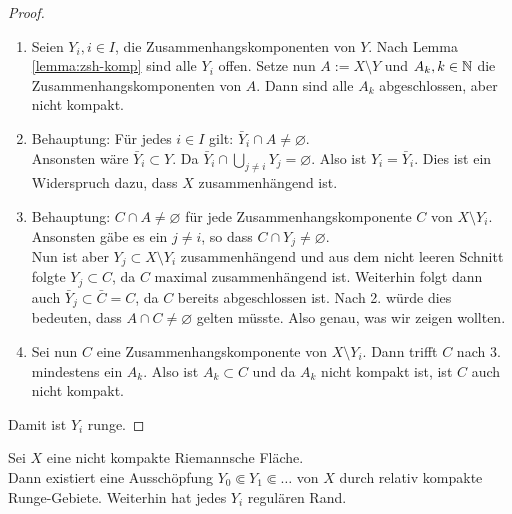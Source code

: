 \begin{proof}
  \begin{enumerate}
  \item Seien $Y_i, i \in I$, die Zusammenhangskomponenten von
    $Y$. Nach Lemma \ref{lemma:zsh-komp} sind alle $Y_i$ offen.
    Setze nun $A := X \setminus Y$ und $A_k, k\in \mathbb{N}$ die
    Zusammenhangskomponenten von $A$. Dann sind alle $A_k$
    abgeschlossen, aber nicht kompakt.
  \item Behauptung: Für jedes $i \in I$ gilt: $\bar Y_i \cap A \neq
    \varnothing$.\\
    Ansonsten wäre $\bar Y_i \subset Y$. Da $\bar Y_i \cap \bigcup_{j
      \neq i} Y_j = \varnothing$. Also ist $Y_i = \bar Y_i$. Dies
    ist ein Widerspruch dazu, dass $X$ zusammenhängend ist.
  \item Behauptung: $C \cap A \neq \varnothing$ für jede
    Zusammenhangskomponente $C$ von $X \setminus Y_i$. \\
    Ansonsten gäbe es ein $j \neq i$, so dass $C \cap Y_j \neq
    \varnothing$. \\
    Nun ist aber $Y_j \subset X \setminus Y_i$ zusammenhängend und aus
    dem nicht leeren Schnitt folgte $Y_j \subset C$, da $C$ maximal
    zusammenhängend ist. Weiterhin folgt dann auch $\bar Y_j \subset
    \bar C = C$, da $C$ bereits abgeschlossen ist. Nach 2. würde dies
    bedeuten, dass $A \cap C \neq \varnothing$ gelten müsste. Also
    genau, was wir zeigen wollten.
  \item Sei nun $C$ eine Zusammenhangskomponente von $X \setminus
    Y_i$. Dann trifft $C$ nach 3. mindestens ein $A_k$. Also ist $A_k
    \subset C$ und da $A_k$ nicht kompakt ist, ist $C$ auch nicht kompakt.
  \end{enumerate}
  Damit ist $Y_i$ runge.
\end{proof}

\begin{thm}
  \label{thm:Ausschöpfung-Runge}
  Sei $X$ eine nicht kompakte Riemannsche Fläche. \\
  Dann existiert eine Ausschöpfung $Y_0 \Subset Y_1 \Subset \dots$ von
  $X$ durch relativ kompakte Runge-Gebiete. Weiterhin hat jedes $Y_i$
  regulären Rand.
\end{thm}

